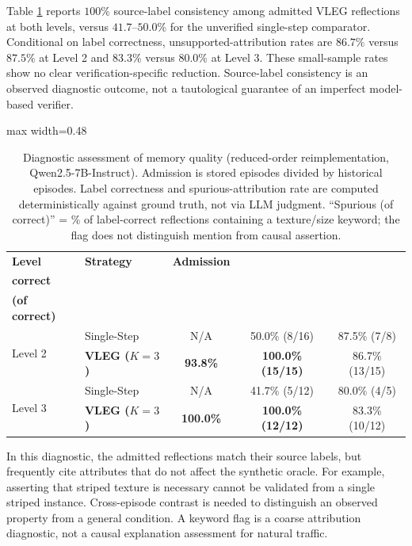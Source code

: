 \documentclass[onecolumn]{IEEEtran}
\numberwithin{equation}{section}
\theoremstyle{definition}
\theoremstyle{remark}
\begin{document}
Table \ref{tab:exp5_memory_quality} reports $100\%$ source-label consistency among admitted VLEG reflections at both levels, versus $41.7$--$50.0\%$ for the unverified single-step comparator. Conditional on label correctness, unsupported-attribution rates are $86.7\%$ versus $87.5\%$ at Level 2 and $83.3\%$ versus $80.0\%$ at Level 3. These small-sample rates show no clear verification-specific reduction. Source-label consistency is an observed diagnostic outcome, not a tautological guarantee of an imperfect model-based verifier.

\begin{table}[htbp]
    \centering
    \caption{Diagnostic assessment of memory quality (reduced-order reimplementation, Qwen2.5-7B-Instruct). Admission is stored episodes divided by historical episodes. Label correctness and spurious-attribution rate are computed deterministically against ground truth, not via LLM judgment. ``Spurious (of correct)'' = \% of label-correct reflections containing a texture/size keyword; the flag does not distinguish mention from causal assertion.}
    \label{tab:exp5_memory_quality}
    \footnotesize
    \setlength{\tabcolsep}{3pt}
    \begin{adjustbox}{max width=0.48\textwidth}
    \begin{tabular}{@{}llccc@{}}
        \toprule
        \textbf{Level} & \textbf{Strategy} & \textbf{Admission} & \shortstack{\textbf{Label-}\\\textbf{correct}} & \shortstack{\textbf{Spurious}\\\textbf{(of correct)}} \\
        \midrule
        \multirow{2}{*}{Level 2} & Single-Step & N/A & 50.0\% (8/16) & 87.5\% (7/8) \\
                                 & \textbf{VLEG ($K{=}3$)} & \textbf{93.8\%} & \textbf{100.0\% (15/15)} & 86.7\% (13/15) \\
        \midrule
        \multirow{2}{*}{Level 3} & Single-Step & N/A & 41.7\% (5/12) & 80.0\% (4/5) \\
                                 & \textbf{VLEG ($K{=}3$)} & \textbf{100.0\%} & \textbf{100.0\% (12/12)} & 83.3\% (10/12) \\
        \bottomrule
    \end{tabular}
    \end{adjustbox}
\end{table}

In this diagnostic, the admitted reflections match their source labels, but frequently cite attributes that do not affect the synthetic oracle. For example, asserting that striped texture is necessary cannot be validated from a single striped instance. Cross-episode contrast is needed to distinguish an observed property from a general condition. A keyword flag is a coarse attribution diagnostic, not a causal explanation assessment for natural traffic.
\end{document}
